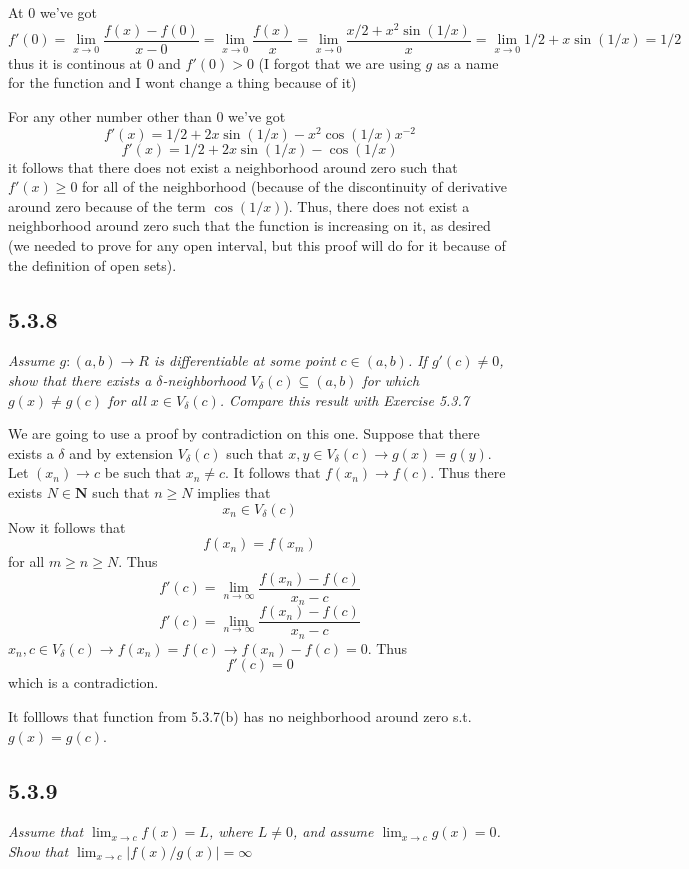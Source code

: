 \documentclass[11pt,oneside,titlepage]{book}
\begin{document}
At $0$ we've got
$$f'(0) = \lim_{x \to 0}\frac{f(x) - f(0)}{x - 0} =
\lim_{x \to 0}\frac{f(x)}{x} =
\lim_{x \to 0}\frac{x / 2 + x^2 \sin(1/x)}{x} =
\lim_{x \to 0} 1 / 2 + x \sin(1/x) = 1/2$$
thus it is continous at $0$ and $f'(0) > 0$ (I forgot that we are using $g$
as a name for the function and I wont change a thing because of it)

For any other number other than $0$ we've got
$$f'(x) =     1 / 2 + 2x \sin(1/x) - x^2  \cos(1/x)  x^{-2}$$
$$f'(x) =     1 / 2 + 2x \sin(1/x) - \cos(1/x)$$
it follows that there does not exist a neighborhood around zero such that
$f'(x) \geq 0$ for all of the neighborhood (because of the discontinuity of
derivative around zero because of the term $\cos(1/x)$). Thus, there
does not exist a neighborhood around zero such that the function is
increasing on it, as desired (we needed to prove for any open interval, but
this proof will do for it because of the definition of open sets).

\subsection*{5.3.8}
\textit{Assume $g: (a, b) \to R$ is differentiable at some point
  $c \in (a, b)$. If $g'(c) \neq 0$, show that there exists a
  $\delta$-neighborhood $V_\delta(c) \subseteq (a, b)$ for which
  $g(x) \neq g(c)$ for all $x \in V_\delta(c)$. Compare this result with
  Exercise 5.3.7}

We are going to use a proof by contradiction on this one. Suppose that
there exists a $\delta$ and by extension $V_\delta(c)$ such that
$x , y \in V_\delta(c) \to g(x) = g(y)$. Let $(x_n) \to c$ be such that
$x_n \neq c$. It follows that $f(x_n) \to f(c)$. Thus there
exists $N \in \textbf{N}$ such that $n \geq N$ implies that
$$x_n \in V_\delta(c)$$
Now it follows that
$$f(x_n) = f(x_m) $$
for all $m \geq n \geq N$. Thus
$$f'(c) = \lim_{n \to \infty}{\frac{f(x_n) - f(c)}{x_n - c}}$$
$$f'(c) = \lim_{n \to \infty}{\frac{f(x_n) - f(c)}{x_n - c}}$$
$x_n, c \in V_\delta(c) \to f(x_n) = f(c) \to f(x_n) - f(c) = 0$. Thus
$$f'(c) = 0$$
which is a contradiction.

It folllows that function from 5.3.7(b) has no neighborhood around zero s.t.
$g(x) = g(c)$.

\subsection*{5.3.9}
\textit{Assume that $\lim_{x \to c}{f(x)} = L$, where $L \neq 0$, and assume
  $\lim_{x \to c}{g(x)} = 0$. Show that $\lim_{x \to c}|f(x)/g(x)| = \infty$}
\end{document}
